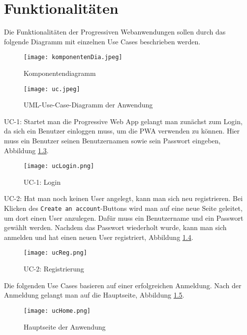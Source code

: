 \chapter{Funktionalitäten}

Die Funktionalitäten der Progressiven Webanwendungen sollen durch das folgende Diagramm mit einzelnen Use Cases beschrieben werden.

\begin{figure}[!htb]
    \centering
    \texttt{[image: komponentenDia.jpeg]}
    \caption{Komponentendiagramm}
    \label{img:kompoDia}
\end{figure}

\begin{figure}[!htb]
    \centering
    \texttt{[image: uc.jpeg]}
    \caption{UML-Use-Case-Diagramm der Anwendung}
    \label{img:uc}
\end{figure}

\clearpage

UC-1:
Startet man die Progressive Web App gelangt man zunächst zum Login, da sich ein Benutzer einloggen muss, um die PWA verwenden zu können. Hier muss ein Benutzer seinen Benutzernamen sowie sein Passwort eingeben, Abbildung \ref{uc1}.

\begin{figure}[!htb]
    \centering
    \texttt{[image: ucLogin.png]}
    \caption{UC-1: Login}
    \label{uc1}
\end{figure}

\clearpage

UC-2: 
Hat man noch keinen User angelegt, kann man sich neu registrieren. Bei Klicken des \texttt{Create an account}-Buttons wird man auf eine neue Seite geleitet, um dort einen User anzulegen. Dafür muss ein Benutzername und ein Passwort gewählt werden. Nachdem das Passwort wiederholt wurde, kann man sich anmelden und hat einen neuen User registriert, Abbildung \ref{uc2}. 

\begin{figure}[!htb]
    \centering
    \texttt{[image: ucReg.png]}
    \caption{UC-2: Registrierung}
    \label{uc2}
\end{figure}

\clearpage

Die folgenden Use Cases basieren auf einer erfolgreichen Anmeldung. Nach der Anmeldung gelangt man auf die Hauptseite, Abbildung \ref{uchome}.

\begin{figure}[!htb]
    \centering
    \texttt{[image: ucHome.png]}
    \caption{Hauptseite der Anwendung}
    \label{uchome}
\end{figure}

